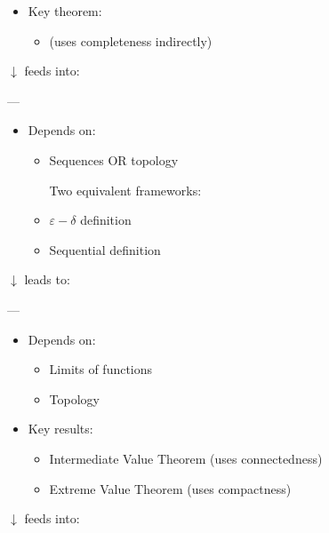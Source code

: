 \documentclass[12pt,a4paper]{report}
\begin{document}
\begin{description}
\begin{itemize}
    \item Key theorem:

		\begin{itemize}
        \item {} (uses completeness indirectly)
		\end{itemize}

	\end{itemize}
$\downarrow$ feeds into:

---

\item {}

	\begin{itemize}
    \item Depends on:

		\begin{itemize}
        \item Sequences OR topology

Two equivalent frameworks:

        \item $\varepsilon-\delta$ definition
        \item Sequential definition
		\end{itemize}

	\end{itemize}
$\downarrow$ leads to:

---

\item {}

	\begin{itemize}
    \item Depends on:

		\begin{itemize}
        \item Limits of functions
        \item Topology
		\end{itemize}

    \item Key results:

		\begin{itemize}
        \item Intermediate Value Theorem (uses connectedness)
        \item Extreme Value Theorem (uses compactness)
		\end{itemize}

	\end{itemize}
$\downarrow$ feeds into:


\end{description}
\end{document}
